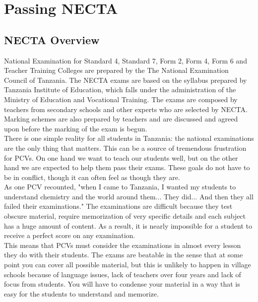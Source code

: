 \chapter{Passing NECTA}
\section{NECTA Overview}

     National Examination for Standard 4, Standard 7, Form 2, Form 4, Form 6 and Teacher Training Colleges are prepared by the The National Examination Council of Tanzania.  The NECTA exams are based on the syllabus prepared by Tanzania Institute of Education, which falls under the administration of the Ministry of Education and Vocational Training. The exams are composed by teachers from secondary schools and other experts who are selected by NECTA. Marking schemes are also prepared by teachers and are discussed and agreed upon before the marking of the exam is begun. \\
      There is one simple reality for all students in Tanzania: the national examinations are the only thing that matters.  This can be a source of tremendous frustration for PCVs.  On one hand we want to teach our students well, but on the other hand we are expected to help them pass their exams.  These goals do not have to be in conflict, though it can often feel as though they are.\\   

      As one PCV recounted, "when I came to Tanzania, I wanted my students to understand chemistry and the world around them...  They did...  And then they all failed their examinations."  The examinations are difficult because they test obscure material, require memorization of very specific details and each subject has a huge amount of content.  As a result, it is nearly impossible for a student to receive a perfect score on any examination.   \\

      This means that PCVs must consider the examinations in almost every lesson they do with their students.  The exams are beatable in the sense that at some point you can cover all possible material, but this is unlikely to happen in village schools because of language issues, lack of teachers over four years and lack of focus from students.  You will have to condense your material in a way that is easy for the students to understand and memorize. 

